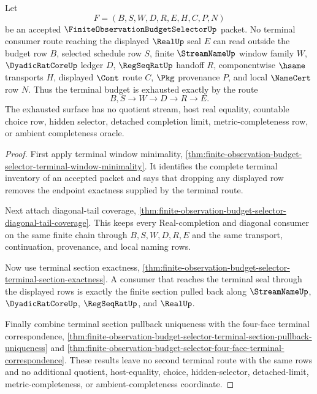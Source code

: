 \begin{theorem}
\label{thm:finite-observation-budget-selector-terminal-budget-exhaustion}
Let
$$
F=(B,S,W,D,R,E,H,C,P,N)
$$
be an accepted $\FiniteObservationBudgetSelectorUp$ packet. No terminal consumer route reaching the displayed $\RealUp$ seal $E$ can read outside the budget row $B$, selected schedule row $S$, finite $\StreamNameUp$ window family $W$, $\DyadicRatCoreUp$ ledger $D$, $\RegSeqRatUp$ handoff $R$, componentwise $\hsame$ transports $H$, displayed $\Cont$ route $C$, $\Pkg$ provenance $P$, and local $\NameCert$ row $N$. Thus the terminal budget is exhausted exactly by the route
$$
B,S \to W \to D \to R \to E.
$$
The exhausted surface has no quotient stream, host real equality, countable choice row, hidden selector, detached completion limit, metric-completeness row, or ambient completeness oracle.
\end{theorem}
\begin{proof}
First apply terminal window minimality, \autoref{thm:finite-observation-budget-selector-terminal-window-minimality}. It identifies the complete terminal inventory of an accepted packet and says that dropping any displayed row removes the endpoint exactness supplied by the terminal route.

Next attach diagonal-tail coverage, \autoref{thm:finite-observation-budget-selector-diagonal-tail-coverage}. This keeps every Real-completion and diagonal consumer on the same finite chain through $B,S,W,D,R,E$ and the same transport, continuation, provenance, and local naming rows.

Now use terminal section exactness, \autoref{thm:finite-observation-budget-selector-terminal-section-exactness}. A consumer that reaches the terminal seal through the displayed rows is exactly the finite section pulled back along $\StreamNameUp$, $\DyadicRatCoreUp$, $\RegSeqRatUp$, and $\RealUp$.

Finally combine terminal section pullback uniqueness with the four-face terminal correspondence, \autoref{thm:finite-observation-budget-selector-terminal-section-pullback-uniqueness} and \autoref{thm:finite-observation-budget-selector-four-face-terminal-correspondence}. These results leave no second terminal route with the same rows and no additional quotient, host-equality, choice, hidden-selector, detached-limit, metric-completeness, or ambient-completeness coordinate.
\end{proof}

